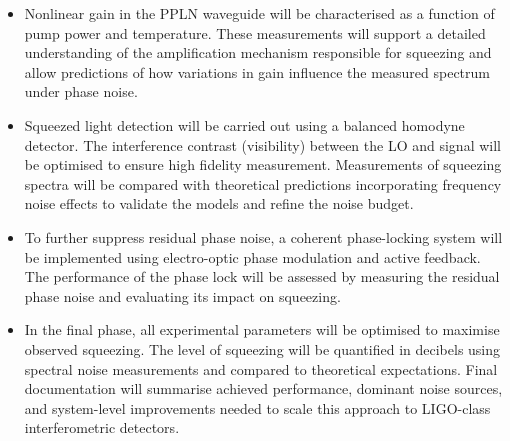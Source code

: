 \documentclass[colorlinks=true,pdfstartview=FitV,linkcolor=blue,
citecolor=red,urlcolor=magenta]{ligodoc}
\begin{document}
\begin{itemize}
    \item Nonlinear gain in the PPLN waveguide will be characterised as a function of pump power and temperature. These measurements will support a detailed understanding of the amplification mechanism responsible for squeezing and allow predictions of how variations in gain influence the measured spectrum under phase noise.

    \item Squeezed light detection will be carried out using a balanced homodyne detector. The interference contrast (visibility) between the LO and signal will be optimised to ensure high fidelity measurement. Measurements of squeezing spectra will be compared with theoretical predictions incorporating frequency noise effects to validate the models and refine the noise budget.

    \item To further suppress residual phase noise, a coherent phase-locking system will be implemented using electro-optic phase modulation and active feedback. The performance of the phase lock will be assessed by measuring the residual phase noise and evaluating its impact on squeezing.

    \item In the final phase, all experimental parameters will be optimised to maximise observed squeezing. The level of squeezing will be quantified in decibels using spectral noise measurements and compared to theoretical expectations. Final documentation will summarise achieved performance, dominant noise sources, and system-level improvements needed to scale this approach to LIGO-class interferometric detectors.
\end{itemize}


\end{document}

